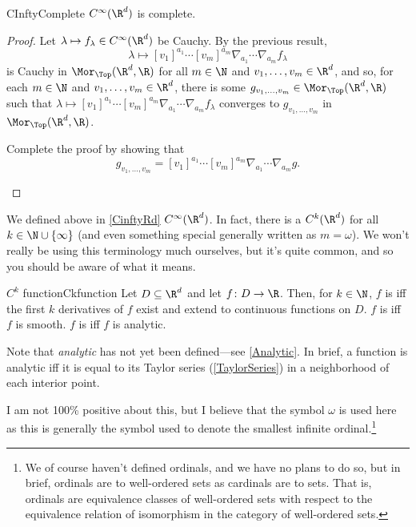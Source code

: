 \begin{thm}{}{CInftyComplete}
$C^{\infty}(\R ^d)$ is complete.
\begin{proof}
Let $\lambda \mapsto f_\lambda \in C^{\infty}(\R ^d)$ be Cauchy.  By the previous result,
\begin{equation}
\lambda \mapsto [v_1]^{a_1}\cdots [v_m]^{a_m}\nabla _{a_1}\cdots \nabla _{a_m}f_\lambda
\end{equation}
is Cauchy in $\Mor _{\Top}(\R ^d,\R )$ for all $m\in \N$ and $v_1,\ldots ,v_m\in \R ^d$, and so, for each $m\in \N$ and $v_1,\ldots ,v_m\in \R ^d$, there is some $g_{v_1,\ldots ,v_m}\in \Mor _{\Top}(\R ^d,\R )$ such that $\lambda \mapsto [v_1]^{a_1}\cdots [v_m]^{a_m}\nabla _{a_1}\cdots \nabla _{a_m}f_\lambda$ converges to $g_{v_1,\ldots ,v_m}$ in $\Mor _{\Top}(\R ^d,\R )$.
\begin{exr}[breakable=false]{}{}
Complete the proof by showing that
\begin{equation}
g_{v_1,\ldots ,v_m}=[v_1]^{a_1}\cdots [v_m]^{a_m}\nabla _{a_1}\cdots \nabla _{a_m}g.
\end{equation}
\end{exr}
\end{proof}
\end{thm}

We defined above in \cref{CinftyRd} $C^{\infty}(\R ^d)$.  In fact, there is a $C^k(\R ^d)$ for all $k\in \N \cup \{ \infty \}$ (and even something special generally written as $m=\omega$).  We won't really be using this terminology much ourselves, but it's quite common, and so you should be aware of what it means.
\begin{dfn}{$C^k$ function}{Ckfunction}
Let $D\subseteq \R ^d$ and let $f\colon D\rightarrow \R$.  Then, for $k\in \N$, $f$ is  iff the first $k$ derivatives of $f$ exist and extend to continuous functions on $D$.  $f$ is  iff $f$ is smooth.  $f$ is  iff $f$ is analytic.
\begin{rmk}
Note that \emph{analytic} has not yet been defined---see \cref{Analytic}.  In brief, a function is analytic iff it is equal to its Taylor series (\cref{TaylorSeries}) in a neighborhood of each interior point.
\end{rmk}
\begin{rmk}
I am not 100\% positive about this, but I believe that the symbol $\omega$ is used here as this is generally the symbol used to denote the smallest infinite ordinal.\footnote{We of course haven't defined ordinals, and we have no plans to do so, but in brief, ordinals are to well-ordered sets as cardinals are to sets.  That is, ordinals are equivalence classes of well-ordered sets with respect to the equivalence relation of isomorphism in the category of well-ordered sets.}
\end{rmk}
\end{dfn}

